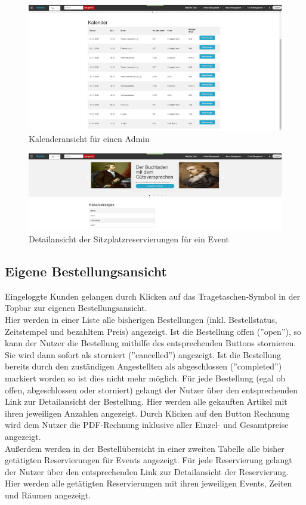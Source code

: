 \documentclass[a4paper]{article}
\begin{document}
\begin{figure}[ht]
\centering
\includegraphics[width=1.0\textwidth]{Kalender2.jpg}
\caption{Kalenderansicht für einen Admin}
\end{figure}
\smallskip

\begin{figure}[ht]
\centering
\includegraphics[width=1.0\textwidth]{Kalenderdetail.jpg}
\caption{Detailansicht der Sitzplatzreservierungen für ein Event}
\end{figure}
\smallskip

\FloatBarrier

\subsection{Eigene Bestellungsansicht} \label{bestellung}

Eingeloggte Kunden gelangen durch Klicken auf das Tragetaschen-Symbol in der Topbar zur eigenen Bestellungsansicht. \\
Hier werden in einer Liste alle bisherigen Bestellungen (inkl. Bestellstatus, Zeitstempel und bezahltem Preis) angezeigt. Ist die Bestellung offen (''open''), so kann der Nutzer die Bestellung mithilfe des entsprechenden Buttons stornieren. Sie wird dann sofort als storniert (''cancelled'') angezeigt. Ist die Bestellung bereits durch den zuständigen Angestellten als abgeschlossen (''completed'') markiert worden so ist dies nicht mehr möglich. Für jede Bestellung (egal ob offen, abgeschlossen oder storniert) gelangt der Nutzer über den entsprechenden Link zur Detailansicht der Bestellung. Hier werden alle gekauften Artikel mit ihren jeweiligen Anzahlen angezeigt. Durch Klicken auf den Button Rechnung wird dem Nutzer die PDF-Rechnung inklusive aller Einzel- und Gesamtpreise angezeigt. \\
Außerdem werden in der Bestellübersicht in einer zweiten Tabelle alle bisher getätigten Reservierungen für Events angezeigt. Für jede Reservierung gelangt der Nutzer über den entsprechenden Link zur Detailansicht der Reservierung. Hier werden alle getätigten Reservierungen mit ihren jeweiligen Events, Zeiten und Räumen angezeigt.
\end{document}
